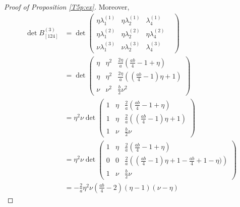 \documentclass[titlepage]{amsart}
\numberwithin{equation}{section}
\theoremstyle{plain}
\theoremstyle{definition}
\theoremstyle{remark}
\begin{document}
\begin{proof}[Proof of Proposition \ref{T5p:ex}]
 
 Moreover, 
 \begin{align*}
\det B^{(3)}_{[124]} &=
%
\det  \begin{pmatrix} \eta \lambda^{(1)}_1  & \eta   \lambda^{(1)}_2 &   \lambda^{(1)}_4 &  \\
\eta  \lambda^{(2)}_1 & \eta \lambda^{(2)}_2 &   \eta  \lambda^{(2)}_4 &  \\
 \nu   \lambda^{(3)}_1 & \nu \lambda^{(3)}_2 &   \lambda^{(3)}_4 
\end{pmatrix}
  \\
%
&= 
\det\begin{pmatrix}
	\eta &\eta^2&\tfrac{2\eta}{a}\left(\tfrac{ab}{4}-1+\eta\right)\\
    \eta &\eta^2&\tfrac{2\eta}{a}\left((\tfrac{ab}{4}-1)\eta+1\right)\\
    \nu &\nu^2&   \tfrac{b}{2}\nu^2
\end{pmatrix}  \\
%
&= \eta^2 \nu
 \det\begin{pmatrix} 
	1 &\eta&\tfrac{2}{a}\left(\tfrac{ab}{4}-1+\eta\right)\\
    1 &\eta&\tfrac{2}{a}\left((\tfrac{ab}{4}-1)\eta+1\right)\\
    1 &\nu&  \tfrac{b}{2}\nu
\end{pmatrix}
\\
&=
\eta^2 \nu
 \det\begin{pmatrix} 
	1 &\eta&\tfrac{2}{a}\left(\tfrac{ab}{4}-1+\eta\right)\\
    0 & 0 &\tfrac{2}{a}     \left((\tfrac{ab}{4}-1)\eta+1     - \tfrac{ab}{4} + 1 - \eta) \right)\\
    1 &\nu&  \tfrac{b}{2}\nu
\end{pmatrix}
\\
&=-\frac{2}{a}\eta^2\nu(\tfrac{ab}{4}-2)(\eta-1)(\nu-\eta)
\end{align*}


\end{proof}
\end{document}

